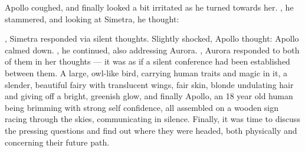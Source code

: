 Apollo coughed, and finally looked a bit irritated as he turned towards her. , he stammered, and looking at Simetra, he thought: 

, Simetra responded via silent thoughts. Slightly shocked, Apollo thought:  
Apollo calmed down. , he continued, also addressing Aurora. , Aurora responded to both of them in her thoughts --- it was as if a silent conference had been established between them. A large, owl-like bird, carrying human traits and magic in it, a slender, beautiful fairy with translucent wings, fair skin, blonde undulating hair and giving off a bright, greenish glow, and finally Apollo, an 18 year old human being brimming with strong self confidence, all assembled on a wooden sign racing through the skies, communicating in silence. Finally, it was time to discuss the pressing questions and find out where they were headed, both physically and concerning their future path.
